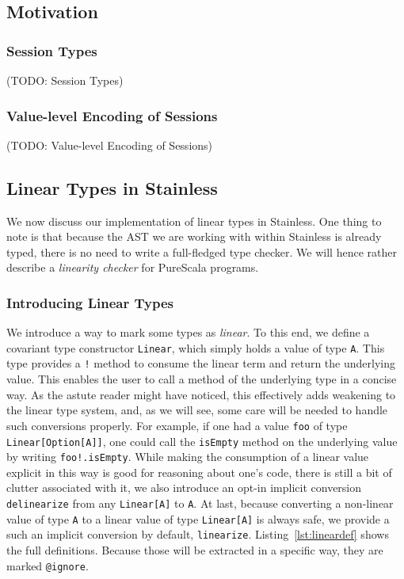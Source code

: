 \documentclass[a4paper,twoside]{article}
\newcommand{\TODO}[1]{\textcolor{YellowOrange}{(TODO: #1)}} %
\newcommand{\RefCode}[1]{Listing~\ref{#1}}
\newcommand{\stt}[1]{\texttt{\small{#1}}}
\begin{document}
\subsection{Motivation}

\subsubsection{Session Types}
\TODO{Session Types}

\subsubsection{Value-level Encoding of Sessions}
\TODO{Value-level Encoding of Sessions}

\subsection{Linear Types in Stainless}

\newcommand{\lin}[1]{\stt{Linear[#1]}}

We now discuss our implementation of linear types in Stainless. One thing to note is that because the AST we are working with within Stainless is already typed, there is no need to write a full-fledged type checker. We will hence rather describe a \textit{linearity checker} for PureScala programs.

\subsubsection*{Introducing Linear Types}

We introduce a way to mark some types as \textit{linear}. To this end, we define a covariant type constructor \stt{Linear}, which simply holds a value of type \stt{A}. This type provides a \stt{!} method to consume the linear term and return the underlying value. This enables the user to call a method of the underlying type in a concise way. As the astute reader might have noticed, this effectively adds weakening to the linear type system, and, as we will see, some care will be needed to handle such conversions properly. For example, if one had a value \stt{foo} of type \stt{Linear[Option[A]]}, one could call the \stt{isEmpty} method on the underlying value by writing \stt{foo!.isEmpty}. While making the consumption of a linear value explicit in this way is good for reasoning about one's code, there is still a bit of clutter associated with it, we also introduce an opt-in implicit conversion \stt{delinearize} from any \stt{Linear[A]} to \stt{A}. At last, because converting a non-linear value of type \stt{A} to a linear value of type \stt{Linear[A]} is always safe, we provide a such an implicit conversion by default, \stt{linearize}. \RefCode{lst:lineardef} shows the full definitions. Because those will be extracted in a specific way, they are marked \stt{@ignore}.
\end{document}

